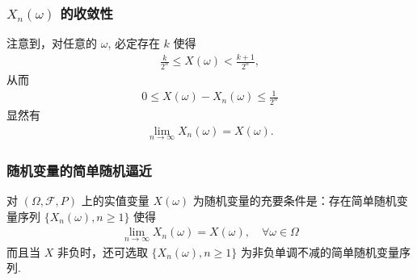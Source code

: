 \begin{frame}
	\frametitle{$X_n (\omega)$ 的收敛性}
	注意到，对任意的 $\omega$, 必定存在 $k$ 使得
	\begin{eqnarray*}
		\frac{k}{2^n}\le X(\omega)<\frac{k+1}{2^n},
	\end{eqnarray*}
	\pause 从而
	\begin{eqnarray*}
		0\le X(\omega)-X_n(\omega)\le \frac{1}{2^n}
	\end{eqnarray*}
	\pause 显然有
	\begin{eqnarray*}
		\lim_{n\rightarrow \infty}X_n(\omega)=X(\omega).
	\end{eqnarray*}
\end{frame}
\begin{frame}
	\frametitle{随机变量的简单随机逼近}
	\begin{thm}
		对 $(\Omega,\mathcal{F},P)$ 上的实值变量 $X (\omega)$ 为随机变量的充要条件是：存在简单随机变量序列 $\{X_n (\omega),n\ge 1\}$ 使得
		\begin{eqnarray*}
			\lim_{n\rightarrow \infty}X_n(\omega)=X(\omega), \quad \forall \omega\in \Omega
		\end{eqnarray*}
		而且当 $X$ 非负时，还可选取 $\{X_n (\omega),n\ge 1\}$ 为非负单调不减的简单随机变量序列.
	\end{thm}
\end{frame}












